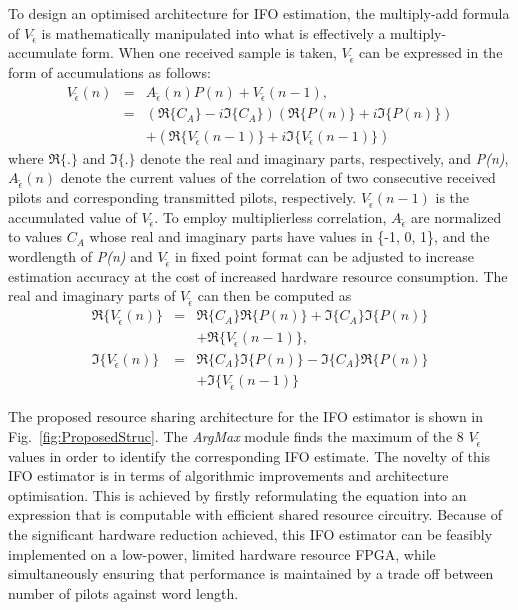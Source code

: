 To design an optimised architecture for IFO estimation, the multiply-add formula of $V_{\tilde{\epsilon}}$ is mathematically manipulated into what is effectively a multiply-accumulate form.
When one received sample is taken, $V_{\tilde{\epsilon}}$ can be expressed in the form of accumulations as follows:
\begin{eqnarray}
\label{complexVi}
V_{\tilde{\epsilon}}(n)	&=&   A_{\tilde{\epsilon}}(n) P(n)  + V_{\tilde{\epsilon}}(n-1), \nonumber \\
						&=& (\Re{\{C_A\}} - i \Im{\{C_A\}})  (\Re{\{P(n)\}} + i \Im{\{P(n)\}}) \nonumber \\
	 					&  &+ (\Re{\{V_{\tilde{\epsilon}}(n-1)\}}+i \Im{\{V_{\tilde{\epsilon}}(n-1)\}})
\end{eqnarray}
where $\Re{\{.\}}$ and $\Im{\{.\}}$ denote the real and imaginary parts, respectively, and \emph{P(n)}, $A_{\tilde{\epsilon}}(n)$ denote the current values of the correlation of two consecutive received pilots and corresponding transmitted pilots, respectively.
$V_{\tilde{\epsilon}}(n-1)$ is the accumulated value of $V_{\tilde{\epsilon}}$.
To employ multiplierless correlation, $A_{\tilde{\epsilon}}$ are normalized to values $C_A$ whose real and imaginary parts have values in \{-1, 0, 1\}, and the wordlength of \emph{P(n)} and $V_{\tilde{\epsilon}}$ in fixed point format can be adjusted to increase estimation accuracy at the cost of increased hardware resource consumption.
The real and imaginary parts of $V_{\tilde{\epsilon}}$ can then be computed as
\begin{eqnarray}
\label{realimaginaryVi}
\Re{\{V_{\tilde{\epsilon}}(n)\}} &=& \Re{\{C_A\}} \Re{\{ P(n)\}}+\Im{\{C_A\}} \Im{\{ P(n)\}} \nonumber \\
								& &+ \Re{\{V_{\tilde{\epsilon}}(n-1)\}} , 					\nonumber \\
\Im{\{V_{\tilde{\epsilon}}(n)\}} &=& \Re{\{C_A\}} \Im{\{ P(n)\}}-\Im{\{C_A\}} \Re{\{ P(n)\}}	\nonumber \\
								& &+ \Im{\{V_{\tilde{\epsilon}}(n-1)\}}
\end{eqnarray}

The proposed resource sharing architecture for the IFO estimator is shown in Fig.~\ref{fig:ProposedStruc}. The \emph{ArgMax} module finds the maximum of the 8 $V_{\tilde{\epsilon}}$ values in order to identify the corresponding IFO estimate.
The novelty of this IFO estimator is in terms of algorithmic improvements and architecture optimisation. This is achieved by firstly reformulating the equation into an expression that is computable with efficient shared resource circuitry.
Because of the significant hardware reduction achieved, this IFO estimator can be feasibly implemented on a low-power, limited hardware resource FPGA, while simultaneously ensuring that performance is maintained by a trade off between number of pilots against word length.

